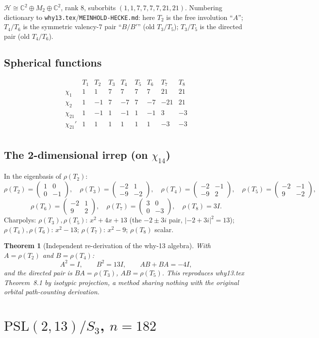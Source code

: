 \documentclass[11pt]{article}
\newtheorem{theorem}{Theorem}[section]
\theoremstyle{remark}
\newcommand{\C}{\mathbb{C}}
\newcommand{\T}[1]{T_{#1}}
\newcommand{\rh}[1]{\rho(T_{#1})}
\newcommand{\mat}[4]{\begin{pmatrix} #1 & #2 \\ #3 & #4 \end{pmatrix}}
\begin{document}
$\mathcal H\cong\C^2\oplus M_2\oplus\C^2$, rank $8$, suborbits
$(1,1,7,7,7,7,21,21)$. Numbering dictionary to
\texttt{why13.tex}/\texttt{MEINHOLD-HECKE.md}: here $\T2$ is the free
involution ``$A$''; $\T4/\T6$ is the symmetric valency-7 pair ``$B/B'$''
(old $\T3/\T5$); $\T3/\T5$ is the directed pair (old $\T4/\T6$).

\subsection{Spherical functions}
\[
\begin{array}{l|rrrrrrrr}
 & \T1 & \T2 & \T3 & \T4 & \T5 & \T6 & \T7 & \T8\\
\hline
\chi_1 & 1 & 1 & 7 & 7 & 7 & 7 & 21 & 21\\
\chi_2 & 1 & -1 & 7 & -7 & 7 & -7 & -21 & 21\\
\chi_{21} & 1 & -1 & 1 & -1 & 1 & -1 & 3 & -3\\
\chi_{21}' & 1 & 1 & 1 & 1 & 1 & 1 & -3 & -3\\
\end{array}
\]

\subsection{The 2-dimensional irrep (on $\chi_{14}$)}

In the eigenbasis of $\rho(\T2)$:
\[
\rh2 = \mat{1}{0}{0}{-1},\quad
\rh3 = \mat{-2}{1}{-9}{-2},\quad
\rh4 = \mat{-2}{-1}{-9}{2},\quad
\rh5 = \mat{-2}{-1}{9}{-2},
\]
\[
\rh6 = \mat{-2}{1}{9}{2},\quad
\rh7 = \mat{3}{0}{0}{-3},\quad
\rh8 = 3I .
\]
Charpolys: $\rh3,\rh5$: $x^2+4x+13$ (the $-2\pm3i$ pair,
$|-2+3i|^2=13$); $\rh4,\rh6$: $x^2-13$; $\rh7$: $x^2-9$; $\rh8$ scalar.

\begin{theorem}[Independent re-derivation of the why-13 algebra]
\label{thm:meinhold}
With $A=\rh2$ and $B=\rh4$:
\[
A^2 = I,\qquad \boxed{B^2 = 13I},\qquad AB+BA = -4I,
\]
and the directed pair is $BA = \rh3$, $AB = \rh5$. This reproduces
\textup{why13.tex} Theorem~8.1 by isotypic projection, a method sharing
nothing with the original orbital path-counting derivation.
\end{theorem}

\section{$\mathrm{PSL}(2,13)/S_3$, $n=182$}\label{sec:psl213}
\end{document}
